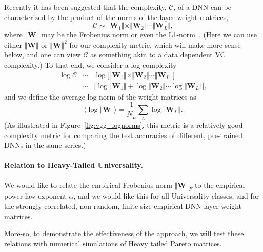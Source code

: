 Recently it has been suggested that the complexity, $\mathcal{C}$, of a DNN can be characterized by the product of the norms of the layer weight matrices,
$$
\mathcal{C}\sim\Vert\mathbf{W}_{1}\Vert\times\Vert\mathbf{W}_{2}\Vert\cdots\Vert\mathbf{W}_{L}\Vert ,
$$
where $\Vert\mathbf{W}\Vert$ may be the Frobenius norm or even the L1-norm~\cite{XXX-XXX,XXX-XXX,XXX-XXX}. 
(Here we can use either $\Vert\mathbf{W}\Vert$ or $\Vert\mathbf{W}\Vert^{2}$ for our complexity metric, which will make more sense below, and one can view $\mathcal{C}$ as something akin to a data dependent VC complexity.)
%
To that end, we consider a log complexity
\begin{eqnarray*}
\log\mathcal{C} &\sim& \log\bigg[\Vert\mathbf{W}_{1}\Vert\times\Vert\mathbf{W}_{2}\Vert\cdots\Vert\mathbf{W}_{L}\Vert\bigg]  \\
                &\sim& \bigg[\log\Vert\mathbf{W}_{1}\Vert+\log\Vert\mathbf{W}_{2}\Vert\cdots\log\Vert\mathbf{W}_{L}\Vert\bigg]  ,
\end{eqnarray*}
and we define the average log norm of the weight matrices as
\begin{equation}
\langle\log\Vert\mathbf{W}\Vert\rangle=\dfrac{1}{N_{L}}\sum_{L}\log\Vert\mathbf{W}_{L}\Vert  .
\label{eqn:av_log_norm}
\end{equation}
(As illustrated in Figure~\ref{fig:vgg_lognorms}, this metric is a relatively good complexity metric for comparing the test accuracies of different, pre-trained DNNs in the same series.)


\paragraph{Relation to Heavy-Tailed Universality.} 

We would like to relate the empirical Frobenius norm $\Vert\mathbf{W}\Vert_{F}$ to the empirical power law exponent $\alpha$, 
and we would like this for all  Universality classes, and for the strongly correlated,  non-random, finite-size empirical DNN 
layer weight matrices.  


More-so, to demonstrate the effectiveness of the approach, we will test these relations with numerical simulations of Heavy tailed Pareto matrices.

